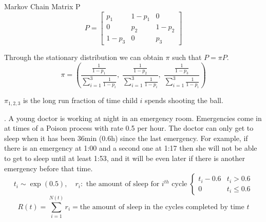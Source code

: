 \documentclass[12pt]{article}
\begin{document}
\begin{enumerate}[label=(\alph*)]
    Markov Chain Matrix P
    $$P=\begin{bmatrix}
    p_1&1-p_1&0\\0&p_2&1-p_2\\1-p_3&0&p_3
    \end{bmatrix}$$
    
   Through the stationary distribution we can obtain $\pi$ such that $P=\pi P$.
   $$\pi = \left(\frac{\frac{1}{1-p_1}}{\sum\limits_{i=1}^3 \frac{1}{1-p_i}},\; \frac{\frac{1}{1-p_2}}{\sum\limits_{i=1}^3 \frac{1}{1-p_i}},\; \frac{\frac{1}{1-p_3}}{\sum\limits_{i=1}^3 \frac{1}{1-p_i}}    \right)$$
   
   $\pi_{1,2,3}$ is the long run fraction of time child $i$ spends shooting the ball.
\end{enumerate}

. A young doctor is working at night in an emergency room. Emergencies come in at times of a Poison process with rate 0.5 per hour. The doctor can only get to sleep when it has been 36min (0.6h) since the last emergency. For example, if there is an emergency at 1:00 and a second one at 1:17 then she will not be able to get to sleep until at least 1:53, and it will be even later if there is another emergency before that time.
$$t_i\sim \exp(0.5), \quad r_i:\text{ the amount of sleep for $i^{th}$ cycle}\; \begin{cases}t_i - 0.6&t_i > 0.6\\0&t_i\le 0.6 \end{cases} $$
$$R(t) = \sum\limits_{i=1}^{N(t)} r_i = \text{the amount of  sleep in the cycles completed by time $t$}$$
\end{document}
